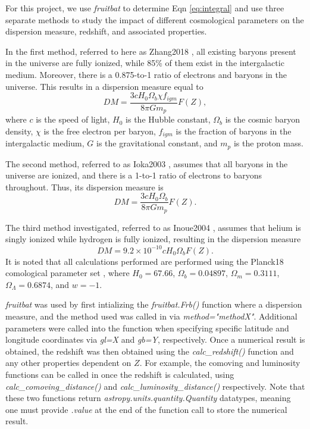 \documentclass{article}
\begin{document}
For this project, we use {\it fruitbat} to determine Eqn \ref{eq:integral} and use three separate methods to study the impact of different cosmological parameters on the dispersion measure, redshift, and associated properties.

In the first method, referred to here as Zhang2018 \cite{Zhang2018}, all existing baryons present in the universe are fully ionized, while 85\% of them exist in the intergalactic medium. Moreover, there is a 0.875-to-1 ratio of electrons and baryons in the universe. This results in a dispersion measure equal to 
\begin{equation}
    DM=\frac{3cH_0\Omega_b\chi f_{igm} }{8\pi G m_p}F(Z),
\end{equation}
where $c$ is the speed of light, $H_0$ is the Hubble constant, $\Omega_b$ is the cosmic baryon density,  $\chi$ is the free electron per baryon, $f_{igm}$ is the fraction of baryons in the intergalactic medium, $G$ is the gravitational constant, and $m_p$ is the proton mass.

The second method, referred to as Ioka2003 \cite{Ioka2003}, assumes that all baryons in the universe are ionized, and there is a 1-to-1 ratio of electrons to baryons throughout. Thus, its dispersion measure is 
\begin{equation}
    DM=\frac{3cH_0 \Omega_b}{8\pi G m_p} F(Z).
\end{equation}

The third method investigated, referred to as Inoue2004 \cite{Inoue2004}, assumes that helium is singly ionized while hydrogen is fully ionized, resulting in the dispersion measure
\begin{equation}
    DM=9.2\times10^{-10}c H_0 \Omega_b F(Z).
\end{equation}
It is noted that all calculations performed are performed using the Planck18 comological parameter set \cite{Planck2018}, where $H_0=67.66$, $\Omega_b=0.04897$, $\Omega_m=0.3111$, $\Omega_\Lambda=0.6874$, and $w=-1$.

{\it fruitbat} was used by first intializing the \emph{fruitbat.Frb()} function where a dispersion measure, and the method used was called in via \emph{method="methodX"}. Additional parameters were called into the function when specifying specific latitude and longitude coordinates via \emph{gl=X} and \emph{gb=Y}, respectively. Once a numerical result is obtained, the redshift was then obtained using the \emph{calc\_redshift()} function and any other properties dependent on $Z$. For example, the comoving and luminosity functions can be called in once the redshift is calculated, using \emph{calc\_comoving\_distance()} and \emph{calc\_luminosity\_distance()} respectively. Note that these two functions return \emph{ astropy.units.quantity.Quantity} datatypes, meaning one must provide \emph{.value} at the end of the function call to store the numerical result.
\end{document}
